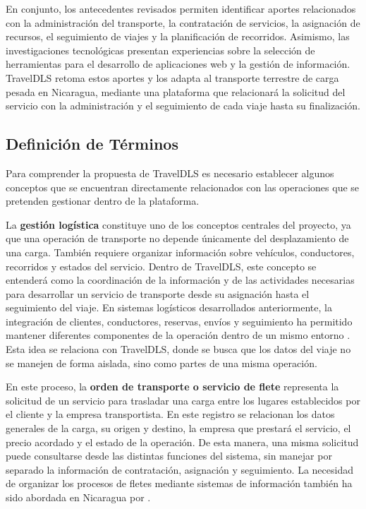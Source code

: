 En conjunto, los antecedentes revisados permiten identificar aportes relacionados con la administración del transporte, la contratación de servicios, la asignación de recursos, el seguimiento de viajes y la planificación de recorridos. Asimismo, las investigaciones tecnológicas presentan experiencias sobre la selección de herramientas para el desarrollo de aplicaciones web y la gestión de información. TravelDLS retoma estos aportes y los adapta al transporte terrestre de carga pesada en Nicaragua, mediante una plataforma que relacionará la solicitud del servicio con la administración y el seguimiento de cada viaje hasta su finalización.


\subsection{Definición de Términos}

Para comprender la propuesta de TravelDLS es necesario establecer algunos conceptos que se encuentran directamente relacionados con las operaciones que se pretenden gestionar dentro de la plataforma.

La \hypertarget{concepto-gestion-logistica}{\textbf{gestión logística}} constituye uno de los conceptos centrales del proyecto, ya que una operación de transporte no depende únicamente del desplazamiento de una carga. También requiere organizar información sobre vehículos, conductores, recorridos y estados del servicio. Dentro de TravelDLS, este concepto se entenderá como la coordinación de la información y de las actividades necesarias para desarrollar un servicio de transporte desde su asignación hasta el seguimiento del viaje. En sistemas logísticos desarrollados anteriormente, la integración de clientes, conductores, reservas, envíos y seguimiento ha permitido mantener diferentes componentes de la operación dentro de un mismo entorno \parencite[pp. 1-4]{sultan2022real}. Esta idea se relaciona con TravelDLS, donde se busca que los datos del viaje no se manejen de forma aislada, sino como partes de una misma operación.


En este proceso, la \hypertarget{concepto-orden}{\textbf{orden de transporte o servicio de flete}} representa la solicitud de un servicio para trasladar una carga entre los lugares establecidos por el cliente y la empresa transportista. En este registro se relacionan los datos generales de la carga, su origen y destino, la empresa que prestará el servicio, el precio acordado y el estado de la operación. De esta manera, una misma solicitud puede consultarse desde las distintas funciones del sistema, sin manejar por separado la información de contratación, asignación y seguimiento. La necesidad de organizar los procesos de fletes mediante sistemas de información también ha sido abordada en Nicaragua por \textcite{aragon2018implementacion}.

